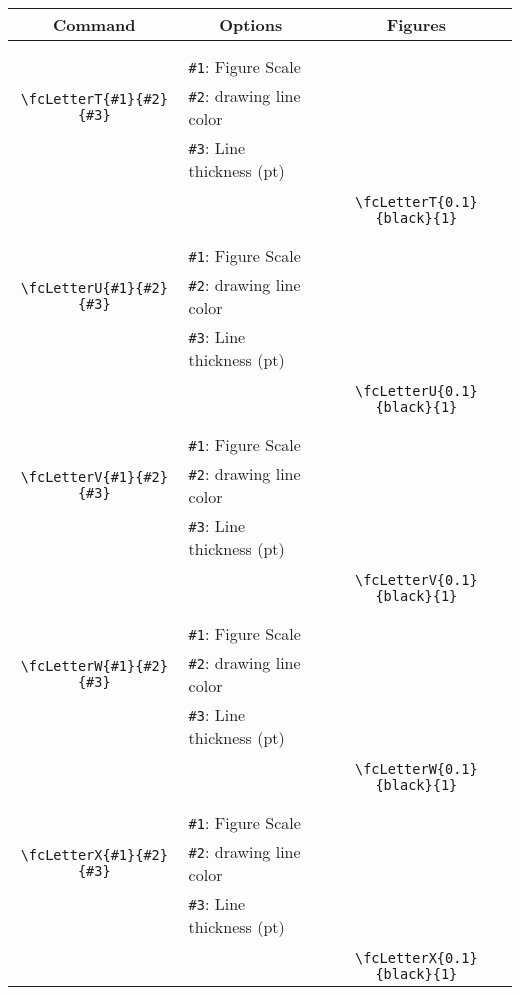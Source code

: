 \documentclass[x11names]{article}
\begin{document}
\begin{table}[H]\centering\begin{tabular}{|c|l|c|}\hline {\bf Command}& \multicolumn{1}{c|}{{\bf Options}} & {\bf Figures}\\  \hline	&&\multirow{5}{*}{\fcLetterT{0.1}{black}{1}}\\	&&\\	&\verb|#1|: Figure Scale &\\	\verb|\fcLetterT{#1}{#2}{#3}|&	\verb|#2|: drawing line color &\\	&\verb|#3|: Line thickness (pt) &\\ &&\\&&	\verb|\fcLetterT{0.1}{black}{1}|\\\hline 	
	&&\multirow{5}{*}{\fcLetterU{0.1}{black}{1}}\\	&&\\	&\verb|#1|: Figure Scale &\\	\verb|\fcLetterU{#1}{#2}{#3}|&	\verb|#2|: drawing line color &\\	&\verb|#3|: Line thickness (pt) &\\ &&\\&&	\verb|\fcLetterU{0.1}{black}{1}|\\\hline 	
	&&\multirow{5}{*}{\fcLetterV{0.1}{black}{1}}\\	&&\\	&\verb|#1|: Figure Scale &\\	\verb|\fcLetterV{#1}{#2}{#3}|&	\verb|#2|: drawing line color &\\	&\verb|#3|: Line thickness (pt) &\\ &&\\&&	\verb|\fcLetterV{0.1}{black}{1}|\\\hline 	
	&&\multirow{5}{*}{\fcLetterW{0.1}{black}{1}}\\	&&\\	&\verb|#1|: Figure Scale &\\	\verb|\fcLetterW{#1}{#2}{#3}|&	\verb|#2|: drawing line color &\\	&\verb|#3|: Line thickness (pt) &\\ &&\\&&	\verb|\fcLetterW{0.1}{black}{1}|\\\hline 	
	&&\multirow{5}{*}{\fcLetterX{0.1}{black}{1}}\\	&&\\	&\verb|#1|: Figure Scale &\\	\verb|\fcLetterX{#1}{#2}{#3}|&	\verb|#2|: drawing line color &\\	&\verb|#3|: Line thickness (pt) &\\ &&\\&&	\verb|\fcLetterX{0.1}{black}{1}|\\\hline 	

\end{tabular}
\end{table}
\end{document}
